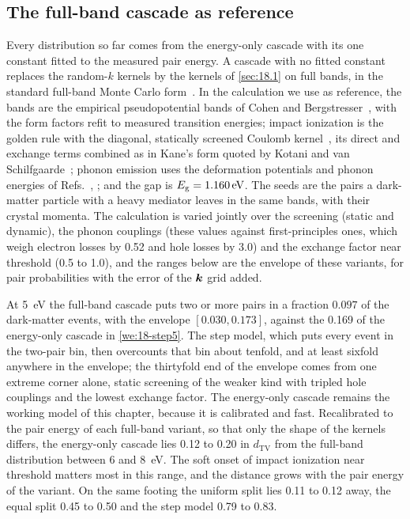 \subsection{The full-band cascade as reference}\label{sec:18.3-fullband}

Every distribution so far comes from the energy-only cascade with its one constant fitted to the measured pair energy. A cascade with no fitted constant replaces the random-$k$ kernels by the kernels of \cref{sec:18.1} on full bands, in the standard full-band Monte Carlo form~\cite{fischetti1988monte}. In the calculation we use as reference, the bands are the empirical pseudopotential bands of Cohen and Bergstresser~\cite{cohen1966band}, with the form factors refit to measured transition energies; impact ionization is the golden rule with the diagonal, statically screened Coulomb kernel~\cite{cappellini1993model}, its direct and exchange terms combined as in Kane's form quoted by Kotani and van Schilfgaarde~\cite[Eq.~(5)]{kotani2010impact}; phonon emission uses the deformation potentials and phonon energies of Refs.~\cite{lundstrom2000fundamentals,jacoboni1983monte}, \cite[Table~III]{li2021deformation}; and the gap is $E_{\mathrm{g}} = \SI{1.160}{eV}$. The seeds are the pairs a dark-matter particle with a heavy mediator leaves in the same bands, with their crystal momenta. The calculation is varied jointly over the screening (static and dynamic), the phonon couplings (these values against first-principles ones, which weigh electron losses by 0.52 and hole losses by 3.0) and the exchange factor near threshold (0.5 to 1.0), and the ranges below are the envelope of these variants, for pair probabilities with the error of the $\bm{k}$ grid added.

At \SI{5}{eV} the full-band cascade puts two or more pairs in a fraction $0.097$ of the dark-matter events, with the envelope $[0.030, 0.173]$, against the 0.169 of the energy-only cascade in \cref{we:18-step5}. The step model, which puts every event in the two-pair bin, then overcounts that bin about tenfold, and at least sixfold anywhere in the envelope; the thirtyfold end of the envelope comes from one extreme corner alone, static screening of the weaker kind with tripled hole couplings and the lowest exchange factor. The energy-only cascade remains the working model of this chapter, because it is calibrated and fast. Recalibrated to the pair energy of each full-band variant, so that only the shape of the kernels differs, the energy-only cascade lies 0.12 to 0.20 in $d_{\mathrm{TV}}$ from the full-band distribution between 6 and \SI{8}{eV}. The soft onset of impact ionization near threshold matters most in this range, and the distance grows with the pair energy of the variant. On the same footing the uniform split lies 0.11 to 0.12 away, the equal split 0.45 to 0.50 and the step model 0.79 to 0.83.

